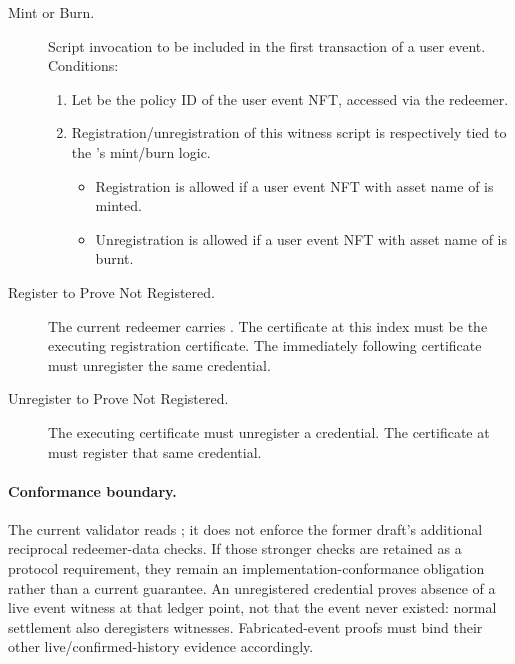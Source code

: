 \documentclass[../midgard.tex]{subfiles}
\begin{document}
\begin{description}
  \item[Mint or Burn.] Script invocation to be included in the first transaction of a user event.
    Conditions:
      \begin{enumerate}
          \item Let  be the policy ID of the user event NFT, accessed via the redeemer.
          \item Registration/unregistration of this witness script is respectively tied to the 's mint/burn logic. 
              \begin{itemize}
                  \item Registration is allowed if a user event NFT with asset name of  is minted.
                  \item Unregistration is allowed if a user event NFT with asset name of  is burnt.
              \end{itemize}
      \end{enumerate}
  \item[Register to Prove Not Registered.] The current redeemer carries .
    The certificate at this index must be the executing registration certificate.
    The immediately following certificate must unregister the same credential.
  \item[Unregister to Prove Not Registered.] The executing certificate must unregister a credential.
    The certificate at  must register that same credential.
\end{description}

\paragraph{Conformance boundary.}
The current validator reads ; it does not enforce the former draft's additional reciprocal redeemer-data checks.
If those stronger checks are retained as a protocol requirement, they remain an implementation-conformance obligation rather than a current guarantee.
An unregistered credential proves absence of a live event witness at that ledger point, not that the event never existed: normal settlement also deregisters witnesses.
Fabricated-event proofs must bind their other live/confirmed-history evidence accordingly.
\end{document}
